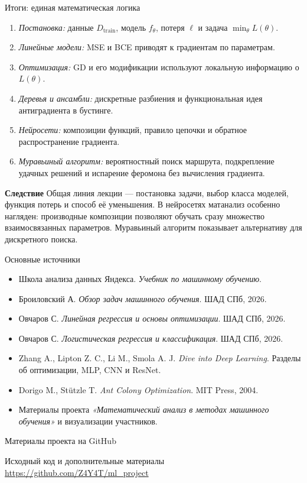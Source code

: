 \documentclass[10pt]{beamer}
\newcommand{\dblue}[1]{\textcolor{defblue}{#1}}
\newcommand{\mlBody}{\normalsize}
\newcommand{\mlConsequence}{\textcolor{defblue}{\bfseries Следствие}}
\begin{document}
\begin{frame}{Итоги: единая математическая логика}
\mlBody
\begin{enumerate}
\item \textit{Постановка:} данные $D_{\mathrm{train}}$, модель $f_\theta$, потеря $\ell$ и задача $\min_\theta L(\theta)$.
\item \textit{Линейные модели:} MSE и BCE приводят к градиентам по параметрам.
\item \textit{Оптимизация:} GD и его модификации используют локальную информацию о $L(\theta)$.
\item \textit{Деревья и ансамбли:} дискретные разбиения и функциональная идея антиградиента в бустинге.
\item \textit{Нейросети:} композиции функций, правило цепочки и обратное распространение градиента.
\item \textit{Муравьиный алгоритм:} вероятностный поиск маршрута,
подкрепление удачных решений и испарение феромона без вычисления градиента.
\end{enumerate}
\mlConsequence\; Общая линия лекции --- постановка задачи,
выбор класса моделей, функция потерь и способ её уменьшения.
В нейросетях матанализ особенно нагляден: производные композиции
позволяют обучать сразу множество взаимосвязанных параметров.
Муравьиный алгоритм показывает альтернативу для дискретного поиска.
\end{frame}

\begin{frame}{Основные источники}
\mlBody
\begin{itemize}
\item Школа анализа данных Яндекса. \textit{Учебник по машинному обучению}.
\item Броиловский А. \textit{Обзор задач машинного обучения}. ШАД СПб, 2026.
\item Овчаров С. \textit{Линейная регрессия и основы оптимизации}. ШАД СПб, 2026.
\item Овчаров С. \textit{Логистическая регрессия и классификация}. ШАД СПб, 2026.
\item Zhang A., Lipton Z. C., Li M., Smola A. J. \textit{Dive into Deep Learning}. Разделы об оптимизации, MLP, CNN и ResNet.
\item Dorigo M., St\"utzle T. \textit{Ant Colony Optimization}. MIT Press, 2004.
\item Материалы проекта \textit{«Математический анализ в методах машинного обучения»} и визуализации участников.
\end{itemize}
\end{frame}

\begin{frame}{Материалы проекта на GitHub}
\vfill
\begin{center}
{\Large \dblue{Исходный код и дополнительные материалы}}\\[1.1em]
{\large \url{https://github.com/Z4Y4T/ml_project}}
\end{center}
\vfill
\end{frame}
\end{document}
